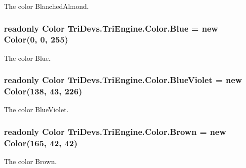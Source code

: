 The color Blanched\-Almond. 

\hypertarget{struct_tri_devs_1_1_tri_engine_1_1_color_a1078a26e4424c6836007aa8aefde6add}{
\subsubsection[{Blue}]{\setlength{\rightskip}{0pt plus 5cm}readonly {\bf Color} Tri\-Devs.\-Tri\-Engine.\-Color.\-Blue = new {\bf Color}(0, 0, 255)\hspace{0.3cm}{\ttfamily [static]}}}\label{struct_tri_devs_1_1_tri_engine_1_1_color_a1078a26e4424c6836007aa8aefde6add}


The color Blue. 

\hypertarget{struct_tri_devs_1_1_tri_engine_1_1_color_a9a0a8b0fbff273450bb7c5fd9d6b01a6}{
\subsubsection[{Blue\-Violet}]{\setlength{\rightskip}{0pt plus 5cm}readonly {\bf Color} Tri\-Devs.\-Tri\-Engine.\-Color.\-Blue\-Violet = new {\bf Color}(138, 43, 226)\hspace{0.3cm}{\ttfamily [static]}}}\label{struct_tri_devs_1_1_tri_engine_1_1_color_a9a0a8b0fbff273450bb7c5fd9d6b01a6}


The color Blue\-Violet. 

\hypertarget{struct_tri_devs_1_1_tri_engine_1_1_color_aaa1555f3b522de595ea9e72e52e36e7e}{
\subsubsection[{Brown}]{\setlength{\rightskip}{0pt plus 5cm}readonly {\bf Color} Tri\-Devs.\-Tri\-Engine.\-Color.\-Brown = new {\bf Color}(165, 42, 42)\hspace{0.3cm}{\ttfamily [static]}}}\label{struct_tri_devs_1_1_tri_engine_1_1_color_aaa1555f3b522de595ea9e72e52e36e7e}


The color Brown. 

